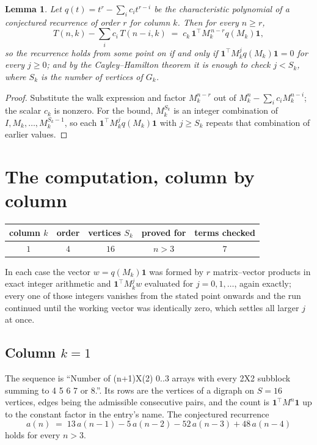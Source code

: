 \documentclass[11pt,a4paper]{article}
\theoremstyle{plain}
\newtheorem{lemma}[theorem]{Lemma}
\theoremstyle{definition}
\begin{document}
\begin{lemma}\label{lem:crit}
Let $q(t)=t^{r}-\sum_i c_it^{r-i}$ be the characteristic polynomial of a conjectured
recurrence of order $r$ for column $k$. Then for every $n\ge r$,
\[
T(n,k)-\sum_i c_i\,T(n-i,k)\;=\;c_k\,\mathbf{1}^{\!\top}M_k^{\,n-r}q(M_k)\mathbf{1},
\]
so the recurrence holds from some point on if and only if
$\mathbf{1}^{\!\top}M_k^{j}q(M_k)\mathbf{1}=0$ for every $j\ge0$; and by the
Cayley--Hamilton theorem it is enough to check $j<S_k$, where $S_k$ is the number of vertices
of $G_k$.
\end{lemma}

\begin{proof}
Substitute the walk expression and factor $M_k^{n-r}$ out of $M_k^{n}-\sum_ic_iM_k^{n-i}$;
the scalar $c_k$ is nonzero. For the bound, $M_k^{S_k}$ is an integer combination of
$I,M_k,\dots,M_k^{S_k-1}$, so each $\mathbf{1}^{\!\top}M_k^{j}q(M_k)\mathbf{1}$ with
$j\ge S_k$ repeats that combination of earlier values.
\end{proof}

\section{The computation, column by column}

\begin{center}
\begin{tabular}{ccccc}
column $k$ & order & vertices $S_k$ & proved for & terms checked \\ \hline
$1$ & $4$ & $16$ & $n>3$ & $7$ \\
\end{tabular}
\end{center}

In each case the vector $w=q(M_k)\mathbf{1}$ was formed by $r$ matrix--vector products in
exact integer arithmetic and $\mathbf{1}^{\!\top}M_k^{j}w$ evaluated for $j=0,1,\dots$,
again exactly; every one of those integers vanishes from the stated point onwards and the run
continued until the working vector was identically zero, which settles all larger $j$ at once.

\subsection*{Column $k=1$}
The sequence is ``Number of (n+1)X(2) 0..3 arrays with every 2X2 subblock summing to 4 5 6 7 or 8.''. Its rows are the vertices of a digraph on
$S=16$ vertices, edges being the admissible consecutive pairs, and the count is
$\mathbf{1}^{\!\top}M^{n}\mathbf{1}$ up to the constant factor in the entry's name.
The conjectured recurrence
\[
a(n)\;=\;13\,a(n-1) - 5\,a(n-2) - 52\,a(n-3) + 48\,a(n-4)
\]
holds for every $n>3$.
\end{document}
